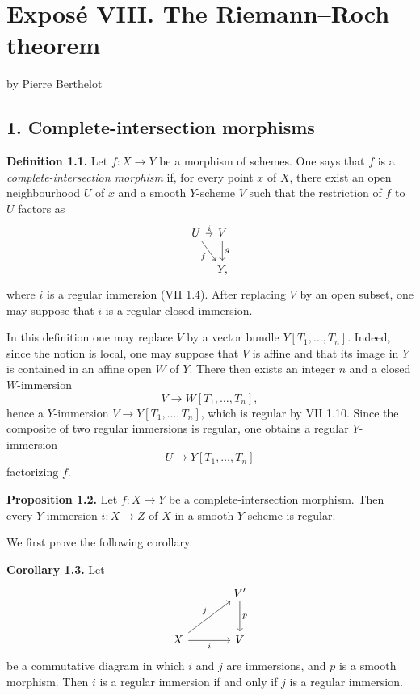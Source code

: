 \documentclass[11pt]{article}
\begin{document}
\providecommand{\etale}{\'etale}
\providecommand{\Ch}{\operatorname{Ch}}


\section*{Expos\'e VIII. The Riemann--Roch theorem}
\begin{center}
by Pierre Berthelot
\end{center}

\subsection*{1. Complete-intersection morphisms}

\textbf{Definition 1.1.} Let $f:X\to Y$ be a morphism of schemes. One says that $f$ is a \emph{complete-intersection morphism} if, for every point $x$ of $X$, there exist an open neighbourhood $U$ of $x$ and a smooth $Y$-scheme $V$ such that the restriction of $f$ to $U$ factors as
\[
\begin{tikzcd}[column sep=tiny]
U \arrow[r,"i"] \arrow[dr,"f"'] & V \arrow[d,"g"]\\
& Y,
\end{tikzcd}
\]
where $i$ is a regular immersion (VII 1.4). After replacing $V$ by an open subset, one may suppose that $i$ is a regular closed immersion.

In this definition one may replace $V$ by a vector bundle $Y[T_1,\ldots,T_n]$. Indeed, since the notion is local, one may suppose that $V$ is affine and that its image in $Y$ is contained in an affine open $W$ of $Y$. There then exists an integer $n$ and a closed $W$-immersion
\[
V\longrightarrow W[T_1,\ldots,T_n],
\]
hence a $Y$-immersion $V\to Y[T_1,\ldots,T_n]$, which is regular by VII 1.10. Since the composite of two regular immersions is regular, one obtains a regular $Y$-immersion
\[
U\longrightarrow Y[T_1,\ldots,T_n]
\]
factorizing $f$.

\textbf{Proposition 1.2.} Let $f:X\to Y$ be a complete-intersection morphism. Then every $Y$-immersion $i:X\to Z$ of $X$ in a smooth $Y$-scheme is regular.

We first prove the following corollary.

\textbf{Corollary 1.3.} Let
\[
\begin{tikzcd}[column sep=large,row sep=large]
& V' \arrow[d,"p"]\\
X \arrow[ur,"j"] \arrow[r,"i"'] & V
\end{tikzcd}
\]
be a commutative diagram in which $i$ and $j$ are immersions, and $p$ is a smooth morphism. Then $i$ is a regular immersion if and only if $j$ is a regular immersion.
\end{document}
